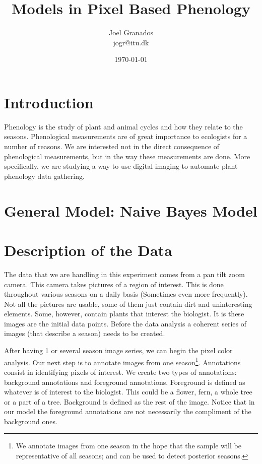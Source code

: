 \documentclass[a4paper,12pt]{report}
\begin{document}
\title{Models in Pixel Based Phenology}
\author{Joel Granados \\ jogr@itu.dk}
\date{ \today }

\maketitle

\section*{Introduction}
Phenology is the study of plant and animal cycles and how they relate to the
seasons. Phenological measurements are of great importance to ecologists for a
number of reasons. We are interested not in the direct consequence of
phenological measurements, but in the way these measurements are done. More
specifically, we are studying a way to use digital imaging to automate plant
phenology data gathering.

\section{General Model: Naive Bayes Model}

\section{Description of the Data}
The data that we are handling in this experiment comes from a pan tilt zoom
camera. This camera takes pictures of a region of interest. This is done
throughout various seasons on a daily basis (Sometimes even more frequently).
Not all the pictures are usable, some of them just contain dirt and
uninteresting elements. Some, however, contain plants that interest the
biologist. It is these images are the initial data points. Before the data
analysis a coherent series of images (that describe a season) needs to be
created.

After having 1 or several season image series, we can begin the pixel color
analysis. Our next step is to annotate images from one season\footnote{We
annotate images from one season in the hope that the sample will be
representative of all seasons; and can be used to detect posterior seasons.}.
Annotations consist in identifying pixels of interest.
We create two types of annotations: background annotations and foreground
annotations. Foreground is defined as whatever is of interest to
the biologist. This could be a flower, fern, a whole tree or a part of a tree.
Background is defined as the rest of the image. Notice that in our model the
foreground annotations are not necessarily the compliment of the background
ones.
\end{document}
